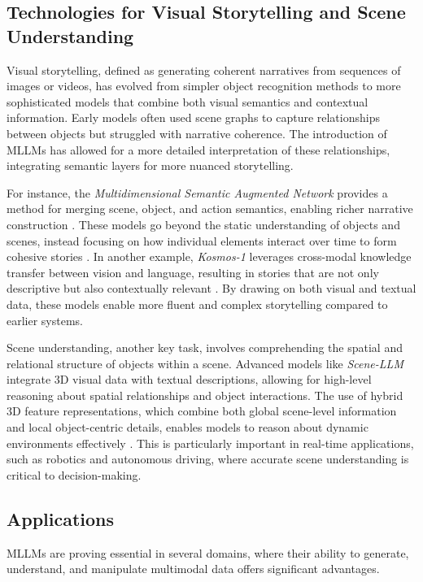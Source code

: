 \subsection{Technologies for Visual Storytelling and Scene Understanding}

Visual storytelling, defined as generating coherent narratives from sequences of images or videos, has evolved from simpler object recognition methods to more sophisticated models that combine both visual semantics and contextual information. Early models often used scene graphs to capture relationships between objects but struggled with narrative coherence. The introduction of MLLMs has allowed for a more detailed interpretation of these relationships, integrating semantic layers for more nuanced storytelling.

For instance, the \textit{Multidimensional Semantic Augmented Network} provides a method for merging scene, object, and action semantics, enabling richer narrative construction \cite{vs2024li}. These models go beyond the static understanding of objects and scenes, instead focusing on how individual elements interact over time to form cohesive stories \cite{vs2024li}. In another example, \textit{Kosmos-1} leverages cross-modal knowledge transfer between vision and language, resulting in stories that are not only descriptive but also contextually relevant \cite{vs2024song}. By drawing on both visual and textual data, these models enable more fluent and complex storytelling compared to earlier systems.

Scene understanding, another key task, involves comprehending the spatial and relational structure of objects within a scene. Advanced models like \textit{Scene-LLM} integrate 3D visual data with textual descriptions, allowing for high-level reasoning about spatial relationships and object interactions. The use of hybrid 3D feature representations, which combine both global scene-level information and local object-centric details, enables models to reason about dynamic environments effectively \cite{vs2024rao}. This is particularly important in real-time applications, such as robotics and autonomous driving, where accurate scene understanding is critical to decision-making.

\subsection{Applications}

MLLMs are proving essential in several domains, where their ability to generate, understand, and manipulate multimodal data offers significant advantages.

